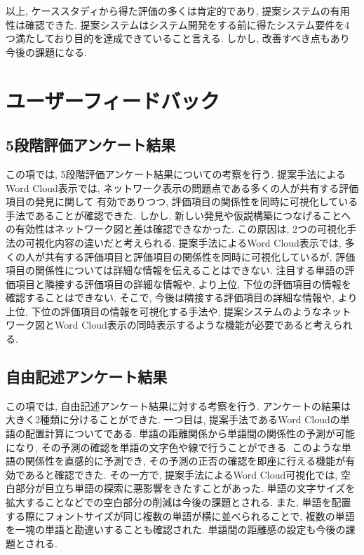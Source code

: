 \documentclass[syuuron]{kuee}
\begin{document}
		以上, ケーススタディから得た評価の多くは肯定的であり, 提案システムの有用性は確認できた. 
		提案システムはシステム開発をする前に得たシステム要件を4つ満たしており目的を達成できていること言える. 
		しかし, 改善すべき点もあり今後の課題になる. 
		
	\section{ユーザーフィードバック}
		\subsection{5段階評価アンケート結果}
		この項では, 5段階評価アンケート結果についての考察を行う. 
		提案手法によるWord Cloud表示では, ネットワーク表示の問題点である多くの人が共有する評価項目の発見に関して
		有効でありつつ, 評価項目の関係性を同時に可視化している手法であることが確認できた. 
		しかし, 新しい発見や仮説構築につなげることへの有効性はネットワーク図と差は確認できなかった. 
		この原因は, 2つの可視化手法の可視化内容の違いだと考えられる. 
		提案手法によるWord Cloud表示では, 多くの人が共有する評価項目と評価項目の関係性を同時に可視化しているが, 
		評価項目の関係性については詳細な情報を伝えることはできない. 
		注目する単語の評価項目と隣接する評価項目の詳細な情報や, より上位, 下位の評価項目の情報を確認することはできない. 
		そこで, 今後は隣接する評価項目の詳細な情報や, より上位, 下位の評価項目の情報を可視化する手法や, 
		提案システムのようなネットワーク図とWord Cloud表示の同時表示するような機能が必要であると考えられる. 
		
		\subsection{自由記述アンケート結果}
		この項では, 自由記述アンケート結果に対する考察を行う. 
		アンケートの結果は大きく2種類に分けることができた. 
		一つ目は, 提案手法であるWord Cloudの単語の配置計算についてである. 
		単語の距離関係から単語間の関係性の予測が可能になり, その予測の確認を単語の文字色や線で行うことができる. 
		このような単語の関係性を直感的に予測でき, その予測の正否の確認を即座に行える機能が有効であると確認できた. 
		その一方で, 提案手法によるWord Cloud可視化では, 空白部分が目立ち単語の探索に悪影響をきたすことがあった. 
		単語の文字サイズを拡大することなどでの空白部分の削減は今後の課題とされる. 
		また, 単語を配置する際にフォントサイズが同じ複数の単語が横に並べられることで, 
		複数の単語を一塊の単語と勘違いすることも確認された. 単語間の距離感の設定も今後の課題とされる. 
	
\end{document}
